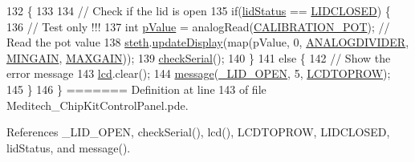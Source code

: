 \begin{DoxyCode}
\begin{DoxyCode}
132                 \{
133 
134   \textcolor{comment}{// Check if the lid is open}
135   \textcolor{keywordflow}{if}(\hyperlink{_meditech___chip_kit_control_panel_8pde_adea51712174a5f82a31231a67e0d4608}{lidStatus} == \hyperlink{_globals_8h_af04a3919dc1fa7d521c9514be995b43d}{LIDCLOSED}) \{
136     \textcolor{comment}{// Test only !!!}
137     \textcolor{keywordtype}{int} \hyperlink{_meditech___chip_kit_control_panel_8pde_a3134d7e85042180eb421c3f6ee88d3b3}{pValue} = analogRead(\hyperlink{_analog_8h_a82418bdd6214d81f79cfdd0ba73bd2cb}{CALIBRATION\_POT});  \textcolor{comment}{// Read the pot value}
138     \hyperlink{_meditech___chip_kit_control_panel_8pde_ac2215fe61cf27d0fc83fa54cf1db73fc}{steth}.\hyperlink{class_l_c_d_stethoscope_a6b1c171fbe2cc21944e26af50135ba31}{updateDisplay}(map(pValue, 0, \hyperlink{_analog_8h_aa87c040916c9c4e5c0f1b3da51466394}{ANALOGDIVIDER}, 
      \hyperlink{_analog_8h_a901b2c5395b6d9dbeb1b7232a0db6d36}{MINGAIN}, \hyperlink{_analog_8h_ad9f7f39b0dfbced74592416643e45475}{MAXGAIN}));
139     \hyperlink{_meditech___chip_kit_control_panel_8pde_a318afc268cf08e16ff1e53698727ec77}{checkSerial}();
140   \}
141   \textcolor{keywordflow}{else} \{
142     \textcolor{comment}{// Show the error message}
143     \hyperlink{_meditech___chip_kit_control_panel_8pde_ae0b100905fb0ed88dddaafda0aa05379}{lcd}.clear();
144     \hyperlink{_meditech___chip_kit_control_panel_8pde_a6144e628c9b27d96d525aac6746e6461}{message}(\hyperlink{_strings_8h_a78ef175fe9eb45ba7ee1772904c1fbab}{\_LID\_OPEN}, 5, \hyperlink{_l_c_d_8h_af51f2930b0a791ffa528731a5cac5756}{LCDTOPROW});
145   \}
146 \}
=======
Definition at line 143 of file Meditech\-\_\-\-Chip\-Kit\-Control\-Panel.\-pde.



References \-\_\-\-L\-I\-D\-\_\-\-O\-P\-E\-N, check\-Serial(), lcd(), L\-C\-D\-T\-O\-P\-R\-O\-W, L\-I\-D\-C\-L\-O\-S\-E\-D, lid\-Status, and message().



\end{DoxyCode}
\end{DoxyCode}
